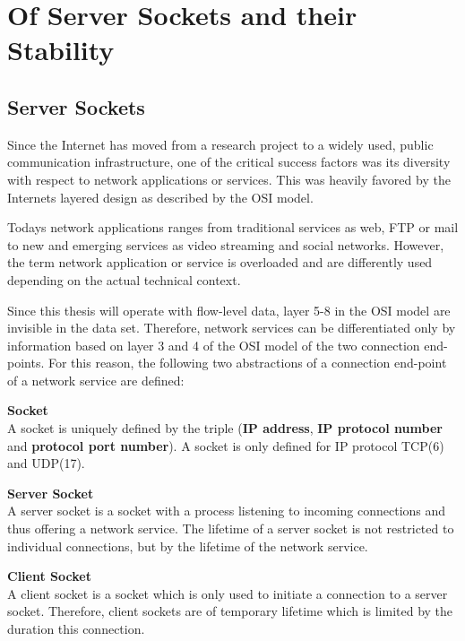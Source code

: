 

\chapter{Of Server Sockets and their Stability 
\label{chapter:sockets}}

\section{Server Sockets} 
Since the Internet has moved from a research project to
a widely used, public communication infrastructure, one of the critical success
factors was its diversity with respect to network applications or services. This
was heavily favored by the Internets layered design as described by the OSI
model. 

Todays network applications ranges from traditional services as web, FTP or mail
to new and emerging services as video streaming and social networks. However,
the term network application or service is overloaded and are differently used
depending on the actual technical context.

Since this thesis will operate with flow-level data, layer 5-8 in the OSI model
are invisible in the data set. Therefore, network services can be differentiated
only by information based on layer 3 and 4 of the OSI model of the two
connection end-points. For this reason, the following two abstractions of a
connection end-point of a network service are defined:

\parbox{\textwidth}{
	\begin{defn}{\textbf{Socket}\\}
		A socket is uniquely defined by the triple (\textbf{IP address}, 
		\textbf{IP protocol number} and \textbf{protocol port number}). A socket 
		is only defined for IP protocol TCP(6) and UDP(17).
	\end{defn}
}

\parbox{\textwidth}{
	\begin{defn}{\textbf{Server Socket\label{def:serversocket}}\\} 
		A server socket is a socket with a process listening to incoming 
		connections and thus offering a network service. The lifetime of a 
		server socket is not restricted to individual connections, but by the 
		lifetime of the network service.
	\end{defn}
}

\parbox{\textwidth}{
	\begin{defn}{\textbf{Client Socket}\\}
		A client socket is a socket which is only used to initiate a  connection 
		to a server socket. Therefore, client sockets are of temporary lifetime 
		which is limited by the duration this connection.
	\end{defn}
}

